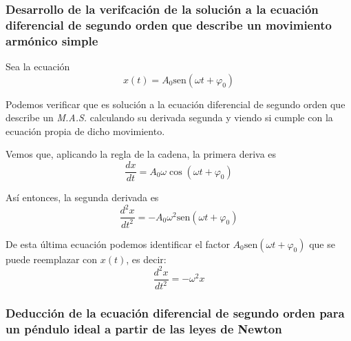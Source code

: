 
\clearpage
\subsubsection{Desarrollo de la verifcación de la solución a la ecuación diferencial de segundo orden que describe un movimiento armónico simple}
\label{subsubsec:verifiacion-solucion-edo-MAS}
Sea la ecuación 
\begin{equation}
   x(t) = A_0 \text{sen}(\omega t + \varphi_0) 
\end{equation}

Podemos verificar que es solución a la ecuación diferencial de segundo orden que describe un \textit{M.A.S.} calculando su derivada segunda y viendo si cumple con la ecuación propia de dicho movimiento. 

Vemos que, aplicando la regla de la cadena, la primera deriva es
\begin{equation}
    \frac{dx}{dt}= A_0\omega \cos(\omega t + \varphi_0)
\end{equation}
 
 Así entonces, la segunda derivada es
 \begin{equation}
     \frac{d^2x}{dt^2}= -A_0\omega^2 \text{sen}(\omega t + \varphi_0)
 \end{equation}
 
 De esta última ecuación podemos identificar el factor $A_0\text{sen}(\omega t+ \varphi_0)$ que se puede reemplazar con $x(t)$, es decir:
\begin{equation}
    \frac{d^2x}{dt^2}= -\omega^2x
\end{equation} 


\clearpage
\subsubsection{Deducción de la ecuación diferencial de segundo orden para un péndulo ideal a partir de las leyes de Newton}
\label{subsubsec:deduccion-edo-pendulo-ideal}


